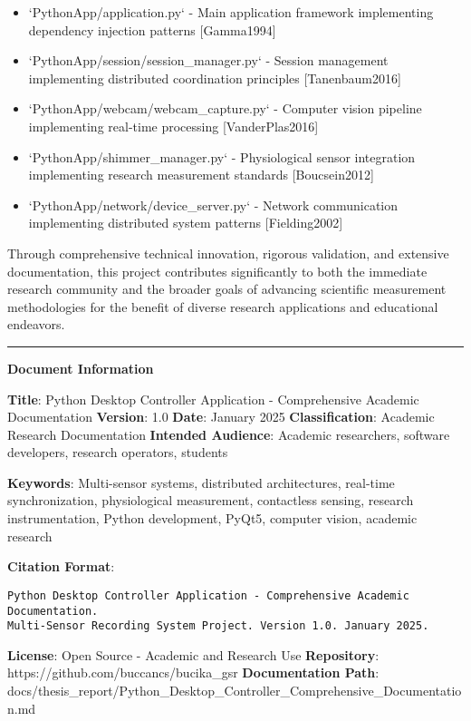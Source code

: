 \documentclass[12pt,a4paper]{article}
\begin{document}
\begin{itemize}
\item `PythonApp/application.py` - Main application framework implementing dependency injection patterns [Gamma1994]
\item `PythonApp/session/session_manager.py` - Session management implementing distributed coordination
  principles [Tanenbaum2016]
\item `PythonApp/webcam/webcam_capture.py` - Computer vision pipeline implementing real-time processing [VanderPlas2016]
\item `PythonApp/shimmer_manager.py` - Physiological sensor integration implementing research measurement
  standards [Boucsein2012]
\item `PythonApp/network/device_server.py` - Network communication implementing distributed system
  patterns [Fielding2002]

\end{itemize}
Through comprehensive technical innovation, rigorous validation, and extensive documentation, this project contributes
significantly to both the immediate research community and the broader goals of advancing scientific measurement
methodologies for the benefit of diverse research applications and educational endeavors.

\hrule

\textbf{Document Information}

\textbf{Title}: Python Desktop Controller Application - Comprehensive Academic Documentation  
\textbf{Version}: 1.0  
\textbf{Date}: January 2025  
\textbf{Classification}: Academic Research Documentation  
\textbf{Intended Audience}: Academic researchers, software developers, research operators, students

\textbf{Keywords}: Multi-sensor systems, distributed architectures, real-time synchronization, physiological measurement,
contactless sensing, research instrumentation, Python development, PyQt5, computer vision, academic research

\textbf{Citation Format}:

\begin{verbatim}
Python Desktop Controller Application - Comprehensive Academic Documentation. 
Multi-Sensor Recording System Project. Version 1.0. January 2025.
\end{verbatim}

\textbf{License}: Open Source - Academic and Research Use  
\textbf{Repository}: https://github.com/buccancs/bucika\_gsr  
\textbf{Documentation Path}: docs/thesis\_report/Python\_Desktop\_Controller\_Comprehensive\_Documentation.md
\end{document}
